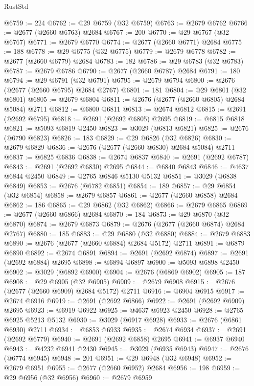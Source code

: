 \begin{lexlean}{RustStd}
\begin{coremodule}
@6759 := 224
@6762 := @29 @6759 (@32 @6759)
@6763 := @2679 @6762
@6766 := @2677 (@2660 @6763) @2684
@6767 := 200
@6770 := @29 @6767 (@32 @6767)
@6771 := @2679 @6770
@6774 := @2677 (@2660 @6771) @2684
@6775 := 188
@6778 := @29 @6775 (@32 @6775)
@6779 := @2679 @6778
@6782 := @2677 (@2660 @6779) @2684
@6783 := 182
@6786 := @29 @6783 (@32 @6783)
@6787 := @2679 @6786
@6790 := @2677 (@2660 @6787) @2684
@6791 := 180
@6794 := @29 @6791 (@32 @6791)
@6795 := @2679 @6794
@6800 := @2676 (@2677 (@2660 @6795) @2684 @2767)
@6801 := 181
@6804 := @29 @6801 (@32 @6801)
@6805 := @2679 @6804
@6811 := @2676 (@2677 (@2660 @6805) @2684 @5084) @2711
@6812 := @6800 @6811
@6813 := @2674 @6812
@6815 := @2691 (@2692 @6795)
@6818 := @2691 (@2692 @6805) @2695
@6819 := @6815 @6818
@6821 := @5093 @6819 @2450
@6823 := @3029 (@6813 @6821)
@6825 := @2676 (@6790 @6823)
@6826 := 183
@6829 := @29 @6826 (@32 @6826)
@6830 := @2679 @6829
@6836 := @2676 (@2677 (@2660 @6830) @2684 @5084) @2711
@6837 := @6825 @6836
@6838 := @2674 @6837
@6840 := @2691 (@2692 @6787)
@6843 := @2691 (@2692 @6830) @2695
@6844 := @6840 @6843
@6846 := @4637 @6844 @2450
@6849 := @2765 @6846 @5130 @5132
@6851 := @3029 (@6838 @6849)
@6853 := @2676 (@6782 @6851)
@6854 := 189
@6857 := @29 @6854 (@32 @6854)
@6858 := @2679 @6857
@6861 := @2677 (@2660 @6858) @2684
@6862 := 186
@6865 := @29 @6862 (@32 @6862)
@6866 := @2679 @6865
@6869 := @2677 (@2660 @6866) @2684
@6870 := 184
@6873 := @29 @6870 (@32 @6870)
@6874 := @2679 @6873
@6879 := @2676 (@2677 (@2660 @6874) @2684 @2767)
@6880 := 185
@6883 := @29 @6880 (@32 @6880)
@6884 := @2679 @6883
@6890 := @2676 (@2677 (@2660 @6884) @2684 @5172) @2711
@6891 := @6879 @6890
@6892 := @2674 @6891
@6894 := @2691 (@2692 @6874)
@6897 := @2691 (@2692 @6884) @2695
@6898 := @6894 @6897
@6900 := @5093 @6898 @2450
@6902 := @3029 (@6892 @6900)
@6904 := @2676 (@6869 @6902)
@6905 := 187
@6908 := @29 @6905 (@32 @6905)
@6909 := @2679 @6908
@6915 := @2676 (@2677 (@2660 @6909) @2684 @5172) @2711
@6916 := @6904 @6915
@6917 := @2674 @6916
@6919 := @2691 (@2692 @6866)
@6922 := @2691 (@2692 @6909) @2695
@6923 := @6919 @6922
@6925 := @4637 @6923 @2450
@6928 := @2765 @6925 @5213 @5132
@6930 := @3029 (@6917 @6928)
@6933 := @2676 (@6861 @6930) @2711
@6934 := @6853 @6933
@6935 := @2674 @6934
@6937 := @2691 (@2692 @6779)
@6940 := @2691 (@2692 @6858) @2695
@6941 := @6937 @6940
@6943 := @4232 @6941 @2430
@6945 := @3029 (@6935 @6943)
@6947 := @2676 (@6774 @6945)
@6948 := 201
@6951 := @29 @6948 (@32 @6948)
@6952 := @2679 @6951
@6955 := @2677 (@2660 @6952) @2684
@6956 := 198
@6959 := @29 @6956 (@32 @6956)
@6960 := @2679 @6959

\end{coremodule}
\end{lexlean}

